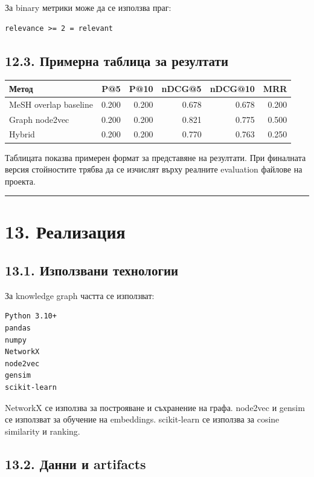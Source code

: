 \documentclass[12pt,a4paper]{article}
\begin{document}
За binary метрики може да се използва праг:

\begin{verbatim}
relevance >= 2 = relevant
\end{verbatim}

\subsection{12.3. Примерна таблица за резултати}

\begin{longtable}{p{}rrrrr}
\toprule
\textbf{Метод} & \textbf{P@5} & \textbf{P@10} & \textbf{nDCG@5} & \textbf{nDCG@10} & \textbf{MRR} \\
\midrule
MeSH overlap baseline & 0.200 & 0.200 & 0.678 & 0.678 & 0.200 \\
Graph node2vec & 0.200 & 0.200 & 0.821 & 0.775 & 0.500 \\
Hybrid & 0.200 & 0.200 & 0.770 & 0.763 & 0.250 \\
\bottomrule
\end{longtable}

Таблицата показва примерен формат за представяне на резултати. При финалната версия стойностите трябва да се изчислят върху реалните evaluation файлове на проекта.

\vspace{0.5em}\hrule\vspace{1.0em}

\section{13. Реализация}

\subsection{13.1. Използвани технологии}

За knowledge graph частта се използват:

\begin{verbatim}
Python 3.10+
pandas
numpy
NetworkX
node2vec
gensim
scikit-learn
\end{verbatim}

NetworkX се използва за построяване и съхранение на графа. node2vec и gensim се използват за обучение на embeddings. scikit-learn се използва за cosine similarity и ranking.

\subsection{13.2. Данни и artifacts}
\end{document}
